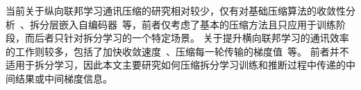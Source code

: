 当前关于纵向联邦学习通讯压缩的研究相对较少，仅有对基础压缩算法的收敛性分析~\cite{castiglia2022compressed_vfl}、拆分层嵌入自编码器~\cite{ayad202vfl}等，前者仅考虑了基本的压缩方法且只应用于训练阶段，而后者只针对拆分学习的一个特定场景。
%
关于提升横向联邦学习的通讯效率的工作则较多，包括了加快收敛速度~\cite{karimireddy2020scaffold,reddi2020fed_opt}、压缩每一轮传输的梯度值~\cite{wen2017terngrad,aji2017sparse,sattler2019sparse_binary}等。
%
前者并不适用于拆分学习，因此本文主要研究如何压缩拆分学习训练和推断过程中传递的中间结果或中间梯度信息。
%

